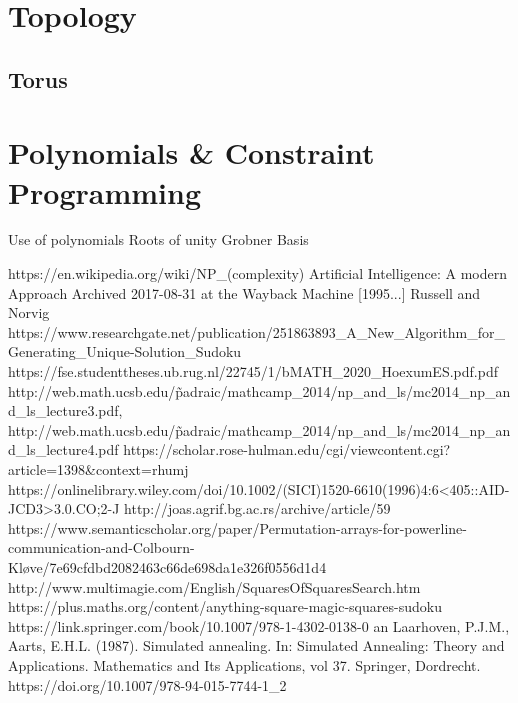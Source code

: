 \documentclass[a4paper,12pt]{article}
\begin{document}
\section{Topology}
	\subsection{Torus}
\section{Polynomials \& Constraint Programming}
	Use of polynomials
	Roots of unity
	Grobner Basis

\begin{thebibliography}{100}
	 https://en.wikipedia.org/wiki/NP\_(complexity)
	 Artificial Intelligence: A modern Approach Archived 2017-08-31 at the Wayback Machine [1995...] Russell and Norvig
	 https://www.researchgate.net/publication/251863893\_A\_New\_Algorithm\_for\_Generating\_Unique-Solution\_Sudoku
	 https://fse.studenttheses.ub.rug.nl/22745/1/bMATH\_2020\_HoexumES.pdf.pdf
	 http://web.math.ucsb.edu/\~padraic/mathcamp\_2014/np\_and\_ls/mc2014\_np\_and\_ls\_lecture3.pdf, http://web.math.ucsb.edu/\~padraic/mathcamp\_2014/np\_and\_ls/mc2014\_np\_and\_ls\_lecture4.pdf
	 https://scholar.rose-hulman.edu/cgi/viewcontent.cgi?article=1398\&context=rhumj
	 https://onlinelibrary.wiley.com/doi/10.1002/(SICI)1520-6610(1996)4:6<405::AID-JCD3>3.0.CO;2-J
	 http://joas.agrif.bg.ac.rs/archive/article/59
	 https://www.semanticscholar.org/paper/Permutation-arrays-for-powerline-communication-and-Colbourn-Kløve/7e69cfdbd2082463c66de698da1e326f0556d1d4
	 http://www.multimagie.com/English/SquaresOfSquaresSearch.htm
	 https://plus.maths.org/content/anything-square-magic-squares-sudoku
	 https://link.springer.com/book/10.1007/978-1-4302-0138-0
	an Laarhoven, P.J.M., Aarts, E.H.L. (1987). Simulated annealing. In: Simulated Annealing: Theory and Applications. Mathematics and Its Applications, vol 37. Springer, Dordrecht. https://doi.org/10.1007/978-94-015-7744-1\_2
\end{thebibliography}
\end{document}

